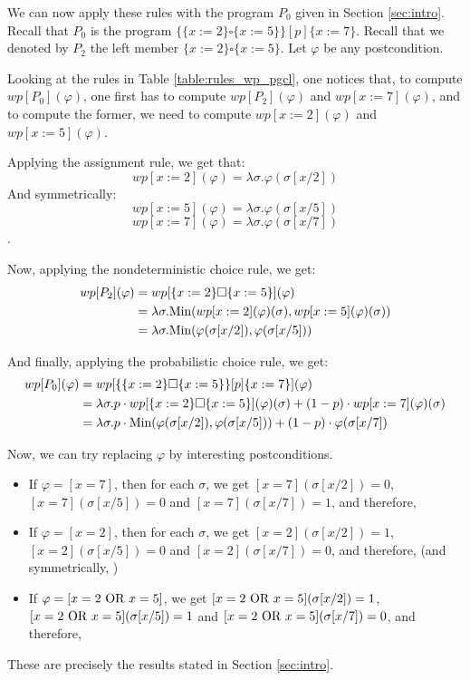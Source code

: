 \documentclass[a4paper,10pt]{llncs}
\def\Min {\textnormal {Min}}
\begin{document}
\begin{example}
We can now apply these rules with the program $P_0$ given in Section \ref{sec:intro}.
Recall that $P_0$ is the program $\{ \{x := 2\} \square \{x := 5\} \} [p] \{ x := 7 \}$. Recall that we denoted by $P_2$ the left member $\{x := 2\} \square \{x := 5\}$. Let $\varphi$ be any postcondition.\bigskip

Looking at the rules in Table \ref{table:rules_wp_pgcl}, one notices that, to compute $wp[P_0](\varphi)$, one first has to compute $wp[P_2](\varphi)$ and $wp[x := 7](\varphi)$, and to compute the former, we need to compute $wp[x := 2](\varphi)$ and $wp[x := 5](\varphi)$.\bigskip

Applying the assignment rule, we get that:
$$wp[x := 2](\varphi) = \lambda\sigma.\varphi(\sigma[x/2])$$
And symmetrically: 
$$wp[x := 5](\varphi) = \lambda\sigma.\varphi(\sigma[x/5])$$
$$wp[x := 7](\varphi) = \lambda\sigma.\varphi(\sigma[x/7])$$.

Now, applying the nondeterministic choice rule, we get:
\begin{align*}
wp[P_2](\varphi) &= wp[\{x := 2\} \square \{x := 5\}](\varphi) \\
&= \lambda\sigma.\Min(wp[x := 2](\varphi)(\sigma),wp[x := 5](\varphi)(\sigma)) \\
&= \lambda\sigma. \Min(\varphi(\sigma[x/2]),\varphi(\sigma[x/5]))
\end{align*}

And finally, applying the probabilistic choice rule, we get:
\begin{align*}
wp[P_0](\varphi) &= wp[\{ \{x := 2\} \square \{x := 5\} \} [p] \{ x := 7 \}](\varphi)\\
&= \lambda\sigma. p \cdot wp[\{x := 2\} \square \{x := 5\}](\varphi)(\sigma) + (1-p) \cdot wp[x := 7](\varphi)(\sigma)\\
&= \lambda\sigma. p \cdot \Min(\varphi(\sigma[x/2]),\varphi(\sigma[x/5])) + (1-p) \cdot \varphi(\sigma[x/7])
\end{align*}

Now, we can try replacing $\varphi$ by interesting postconditions.
\begin{itemize}
\item If $\varphi = [x = 7]$, then for each $\sigma$, we get $[x = 7](\sigma[x/2]) = 0$, $[x = 7](\sigma[x/5]) = 0$ and $[x = 7](\sigma[x/7]) = 1$, and therefore, 
\item If $\varphi = [x = 2]$, then for each $\sigma$, we get $[x = 2](\sigma[x/2]) = 1$, $[x = 2](\sigma[x/5]) = 0$ and $[x = 2](\sigma[x/7]) = 0$, and therefore,  (and symmetrically, )
\item If $\varphi = [x = 2 \textnormal{ OR } x = 5]$, we get $[x = 2 \textnormal{ OR } x = 5](\sigma[x/2]) = 1$, $[x = 2 \textnormal{ OR } x = 5](\sigma[x/5]) = 1$ and $[x = 2 \textnormal{ OR } x = 5](\sigma[x/7]) = 0$, and therefore, 
\end{itemize}
These are precisely the results stated in Section \ref{sec:intro}.
\end{example}
\end{document}
